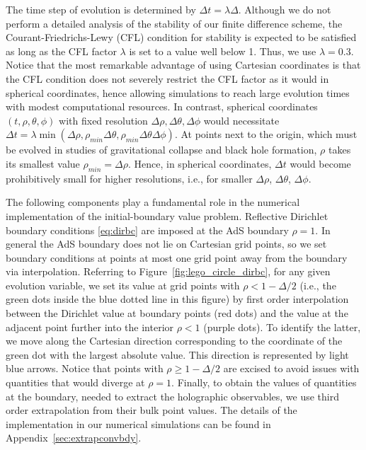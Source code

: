 \documentclass[aps,letterpaper,twocolumn,nofootinbib]{revtex4}
\numberwithin{equation}{section}
\begin{document}
The time step of evolution is determined by $\Delta t=\lambda \Delta$. 
Although we do not perform a detailed analysis of the stability of our finite difference scheme, the Courant-Friedrichs-Lewy (CFL) condition for stability is expected to be satisfied as long as the CFL factor $\lambda$ is set to a value well below 1. Thus, we use $\lambda=0.3$. Notice that the most remarkable advantage of using Cartesian coordinates is that the CFL condition does not severely restrict the CFL factor as it would in spherical coordinates, hence allowing simulations to reach large evolution times with modest computational resources.
In contrast, spherical coordinates $(t,\rho,\theta,\phi)$ with fixed resolution $\Delta\rho,\Delta\theta,\Delta\phi$ would necessitate $\Delta t = \lambda \min(\Delta\rho, \rho_{min} \Delta\theta, \rho_{min} \Delta\theta \Delta\phi)$.
At points next to the origin, which must be evolved in studies of gravitational collapse and black hole formation, $\rho$ takes its smallest value $\rho_{min}=\Delta\rho$. 
Hence, in spherical coordinates, $\Delta t$ would become prohibitively small for higher resolutions, i.e., for smaller $\Delta\rho$, $\Delta\theta$, $\Delta\phi$.

The following components play a fundamental role in the numerical implementation of the initial-boundary value problem.
Reflective Dirichlet boundary conditions \eqref{eq:dirbc} are imposed at the AdS boundary $\rho=1$.
In general the AdS boundary does not lie on Cartesian grid points, so we set boundary conditions at points at most one grid point away from the boundary via interpolation. Referring to Figure~\ref{fig:lego_circle_dirbc}, for any given evolution variable, we set its value at grid points with $\rho<1-\Delta/2$ (i.e., the green dots inside the blue dotted line in this figure) by first order interpolation between the Dirichlet value at boundary points (red dots) and the value at the adjacent point further into the interior $\rho<1$ (purple dots). To identify the latter, we move along the Cartesian direction corresponding to the coordinate of the green dot with the largest absolute value. This direction is represented by light blue arrows. Notice that points with $\rho\geq1-\Delta/2$ are excised to avoid issues with quantities that would diverge 
at $\rho=1$. Finally, to obtain the values of quantities at the boundary, needed to extract the holographic observables, we use third order extrapolation from their bulk point values. 
The details of the implementation in our numerical simulations can be found in Appendix~\ref{sec:extrapconvbdy}.
\end{document}
